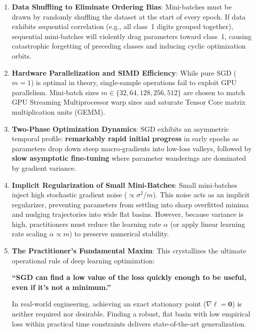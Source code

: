 \begin{enumerate}
  \item \textbf{Data Shuffling to Eliminate Ordering Bias}:
    Mini-batches must be drawn by randomly shuffling the dataset at the start of every epoch. If data exhibits sequential correlation (e.g., all class~1 digits grouped together), sequential mini-batches will violently drag parameters toward class~1, causing catastrophic forgetting of preceding classes and inducing cyclic optimization orbits.
  \item \textbf{Hardware Parallelization and SIMD Efficiency}:
    While pure SGD ($m = 1$) is optimal in theory, single-sample operations fail to exploit GPU parallelism. Mini-batch sizes $m \in \{32, 64, 128, 256, 512\}$ are chosen to match GPU Streaming Multiprocessor warp sizes and saturate Tensor Core matrix multiplication units (GEMM).
  \item \textbf{Two-Phase Optimization Dynamics}:
    SGD exhibits an asymmetric temporal profile: \textbf{remarkably rapid initial progress} in early epochs as parameters drop down steep macro-gradients into low-loss valleys, followed by \textbf{slow asymptotic fine-tuning} where parameter wanderings are dominated by gradient variance.
  \item \textbf{Implicit Regularization of Small Mini-Batches}:
    Small mini-batches inject high stochastic gradient noise ($\propto \sigma^2 / m$). This noise acts as an implicit regularizer, preventing parameters from settling into sharp overfitted minima and nudging trajectories into wide flat basins. However, because variance is high, practitioners must reduce the learning rate $\alpha$ (or apply linear learning rate scaling $\alpha \propto m$) to preserve numerical stability.
  \item \textbf{The Practitioner's Fundamental Maxim}:
    This crystallizes the ultimate operational rule of deep learning optimization:
    \begin{center}
    \textbf{\large\color{politoNavy} ``SGD can find a low value of the loss quickly enough to be useful, even if it's not a minimum.''}
    \end{center}
    In real-world engineering, achieving an exact stationary point ($\nabla \ell = \mathbf{0}$) is neither required nor desirable. Finding a robust, flat basin with low empirical loss within practical time constraints delivers state-of-the-art generalization.
\end{enumerate}

\clearpage
\enlargethispage{\baselineskip}
